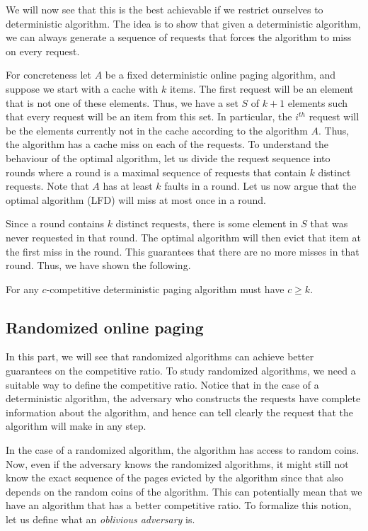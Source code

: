 We will now see that this is the best achievable if we restrict ourselves to deterministic algorithm. The idea is to show that given a deterministic algorithm, we can always generate a sequence of requests that forces the algorithm to miss on every request. 

For concreteness let $A$ be a fixed deterministic online paging algorithm, and suppose we start with a cache with $k$ items. The first request will be an element that is not one of these elements. Thus, we have a set $S$ of $k+1$ elements such that every request will be an item from this set. In particular, the $i^{th}$ request will be the elements currently not in the cache according to the algorithm $A$. Thus, the algorithm has a cache miss on each of the requests. To understand the behaviour of the optimal algorithm, let us divide the request sequence into rounds where a round is a maximal sequence of requests that contain $k$ distinct requests. Note that $A$ has at least $k$ faults in a round. Let us now argue that the optimal algorithm (LFD) will miss at most once in a round. 

Since a round contains $k$ distinct requests, there is some element in $S$ that was never requested in that round. The optimal algorithm will then evict that item at the first miss in the round. This guarantees that there are no more misses in that round. Thus, we have shown the following.

\begin{theorem}
	For any $c$-competitive deterministic paging algorithm must have $c \geq k$.
	\label{thm:paging-det-lb}
\end{theorem}

\subsection{Randomized online paging}

In this part, we will see that randomized algorithms can achieve better guarantees on the competitive ratio. To study randomized algorithms, we need a suitable way to define the competitive ratio. Notice that in the case of a deterministic algorithm, the adversary who constructs the requests have complete information about the algorithm, and hence can tell clearly the request that the algorithm will make in any step.

In the case of a randomized algorithm, the algorithm has access to random coins. Now, even if the adversary knows the randomized algorithms, it might still not know the exact sequence of the pages evicted by the algorithm since that also depends on the random coins of the algorithm. This can potentially mean that we have an algorithm that has a better competitive ratio. To formalize this notion, let us define what an \emph{oblivious adversary} is.

